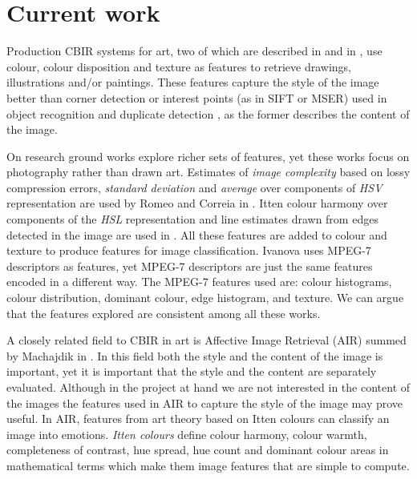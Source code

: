\documentclass[a4paper]{article}
\begin{document}
\section{Current work}

Production CBIR systems for art, two of which are described in \cite{cfsp12air}
and in \cite{ymvz03tree}, use colour, colour disposition and texture as
features to retrieve drawings, illustrations and/or paintings.  These features
capture the style of the image better than corner detection or interest points
(as in SIFT or MSER) used in object recognition and duplicate detection
\cite{szel11book}, as the former describes the content of the image.

On research ground works explore richer sets of features, yet these works focus
on photography rather than drawn art.  Estimates of \emph{image complexity}
based on lossy compression errors, \emph{standard deviation} and \emph{average}
over components of \emph{HSV} representation are used by Romeo and Correia in
\cite{jma12clas,cmrc13fs,rmc12ajs}.  Itten colour harmony over components of
the \emph{HSL} representation and line estimates drawn from edges detected in
the image are used in \cite{mach10clas}.  All these features are added to
colour and texture to produce features for image classification.  Ivanova
\cite{isv12mpeg} uses MPEG-7 descriptors as features, yet MPEG-7 descriptors
are just the same features encoded in a different way.  The MPEG-7 features
used are: colour histograms, colour distribution, dominant colour, edge
histogram, and texture.  We can argue that the features explored are consistent
among all these works.

A closely related field to CBIR in art is Affective Image Retrieval (AIR)
summed by Machajdik in \cite{mach10ua,mach10clas}.  In this field both the
style and the content of the image is important, yet it is important that the
style and the content are separately evaluated.  Although in the project at
hand we are not interested in the content of the images the features used in
AIR to capture the style of the image may prove useful.  In AIR, features from
art theory based on Itten colours can classify an image into emotions.
\emph{Itten colours} define colour harmony, colour warmth, completeness of
contrast, hue spread, hue count and dominant colour areas in mathematical terms
which make them image features that are simple to compute.

\end{document}
